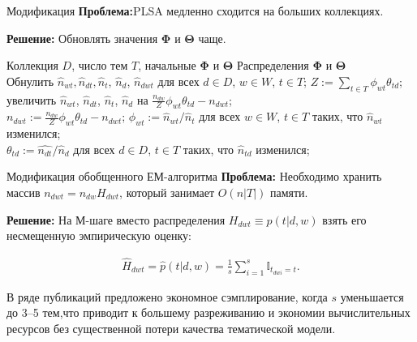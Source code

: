 \documentclass[unicode,9pt, pdf]{beamer}
\begin{document}
\begin{frame}{Модификация}
\textbf{Проблема:}{PLSA медленно сходится на больших коллекциях.}

\vspace{0.2 cm}

\textbf{Решение:} Обновлять значения $\mathbf{\Phi}$ и $\mathbf{\Theta}$ чаще.
\begin{algorithm}[H]
\begin{algorithmic}[1]
\REQUIRE Коллекция $D$, число тем $T$, начальные $\mathbf{\Phi}$ и $\mathbf{\Theta}$
\ENSURE Распределения $\mathbf{\Phi}$ и $\mathbf{\Theta}$\\
\STATE Обнулить $\hat{n}_{w t}, \hat{n}_{d t}, \hat{n}_t$, $\hat{n}_d$, $\hat{n}_{d w t}$ для всех $d \in D$, $w \in W$, $t \in T$;
\REPEAT
{}
\STATE $Z:=\sum_{t \in T} \phi_{w t} \theta_{t d}$;
\STATE увеличить $\hat{n}_{w t}$, $\hat{n}_{d t}$, $\hat{n}_t$, $\hat{n}_d$ на $\frac{n_{d w}}{Z}\phi_{w t} \theta_{t d} - n_{d w t}$;\\
$n_{d w t} := \frac{n_{d w}}{Z} \phi_{w t} \theta_{t d} - n_{d w t}$;
\ENDFOR
{}
\STATE $\phi_{w t} := \hat{n}_{w t}/\hat{n}_t$ для всех $w \in W$, $t \in T$ таких, что $\hat{n}_{w t}$ изменился;\\

$\theta_{t d} := \hat{n_{d t}}/\hat{n}_d$ для всех $d \in D$, $t\in T$ таких, что $\hat{n}_{t d}$ изменился;
\ENDIF
\ENDFOR
{}
\end{algorithmic}
\caption{Обобщенный ЕМ-алгоритм}
\label{alg:seq}
\end{algorithm}
    
\end{frame}

\begin{frame}{Модификация обобщенного ЕМ-алгоритма}
\textbf{Проблема:} Необходимо хранить массив $n_{d w t} = n_{d w} H_{ d w t}$, который занимает $O(n|T|)$ памяти.\\

\hspace{0.4 cm}

\textbf{Решение:} На М-шаге вместо распределения $H_{d w t} \equiv p(t|d, w)$ взять его несмещенную эмпирическую оценку:

\begin{gather*}
\hat{H}_{d w t} = \hat{p}(t| d, w) = \frac{1}{s}\sum\limits_{i=1}^s \mathbb{I}_{t_{d w i} = t}.
\end{gather*}

В ряде публикаций предложено экономное сэмплирование, когда $s$ уменьшается до 3–5 тем,что приводит к большему разреживанию и экономии вычислительных ресурсов без существенной потери качества тематической модели.
\end{frame}
  
       
\end{document}

